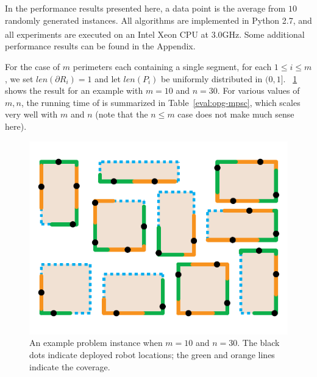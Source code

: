 In the performance results presented here, a data point is the 
average from $10$ randomly generated \opg instances. All algorithms 
are implemented in Python 2.7, and all experiments are executed on 
an Intel\textsuperscript{\textregistered} Xeon\textsuperscript{\textregistered} 
CPU at 3.0GHz. %
Some additional performance results can be found in the Appendix.

For the case of $m$ perimeters each containing a single segment, for 
each $1 \le i \le m$, we set $len(\partial R_i) = 1$ and let $len(P_i)$ 
be uniformly distributed in $(0, 1]$. ~\ref{fig:opg-mpsc-example} shows 
the result for an example with $m = 10$ and $n = 30$. For various values 
of $m, n$, the running time of \algoMRSimple is summarized in 
Table~\ref{eval:opg-mpsc}, which scales very well with $m$ and $n$ (note that 
the $n \le m$ case does not make much sense here). 

\begin{figure}[ht!]
    \vspace*{-3mm}
    \centering
    \includegraphics[keepaspectratio, scale=0.32]{./chapters/opg/figures/mpsc-example-eps-converted-to.pdf}
    \vspace*{-6mm}
    \caption[An example problem instance for MPSC]{\label{fig:opg-mpsc-example} 
    An example problem instance when $m = 10$ and $n = 30$. The black dots
		indicate deployed robot locations; the green and orange lines indicate
		the coverage.
		}
    \vspace*{-2mm}
\end{figure}

